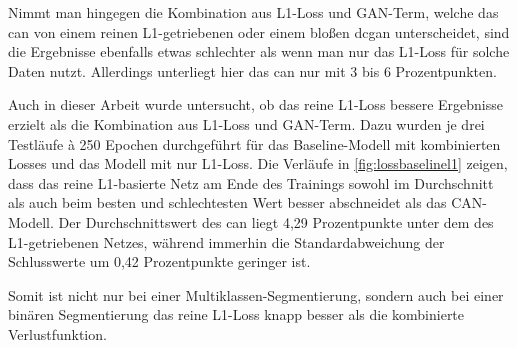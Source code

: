 Nimmt man hingegen die Kombination aus L1-Loss und GAN-Term, welche das \gls{can} von einem reinen L1-getriebenen oder einem bloßen \gls{dcgan} unterscheidet, sind die Ergebnisse ebenfalls etwas schlechter als wenn man nur das L1-Loss für solche Daten nutzt.
Allerdings unterliegt hier das \gls{can} nur mit 3 bis 6 Prozentpunkten.

Auch in dieser Arbeit wurde untersucht, ob das reine L1-Loss bessere Ergebnisse erzielt als die Kombination aus L1-Loss und GAN-Term.
Dazu wurden je drei Testläufe à 250 Epochen durchgeführt für das Baseline-Modell mit kombinierten Losses und das Modell mit nur L1-Loss.
Die Verläufe in \autoref{fig:lossbaselinel1} zeigen, dass das reine L1-basierte Netz am Ende des Trainings sowohl im Durchschnitt als auch beim besten und schlechtesten Wert besser abschneidet als das CAN-Modell.
Der Durchschnittswert des \gls{can} liegt 4,29 Prozentpunkte unter dem des L1-getriebenen Netzes, während immerhin die Standardabweichung der Schlusswerte um 0,42 Prozentpunkte geringer ist.


Somit ist nicht nur bei einer Multiklassen-Segmentierung, sondern auch bei einer binären Segmentierung das reine L1-Loss knapp besser als die kombinierte Verlustfunktion.
